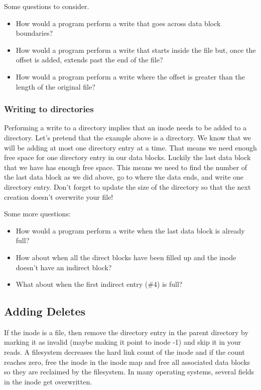 Some questions to consider.

\begin{itemize}
    \item How would a program perform a write that goes across data block boundaries?
    \item How would a program perform a write that starts inside the file but, once the offset is added, extends past the end of the file?
    \item How would a program perform a write where the offset is greater than the length of the original file?
\end{itemize}

\subsubsection{Writing to directories}
Performing a write to a directory implies that an inode needs to be added to a directory.
Let's pretend that the example above is a directory.
We know that we will be adding at most one directory entry at a time.
That means we need enough free space for one directory entry in our data blocks.
Luckily the last data block that we have has enough free space.
This means we need to find the number of the last data block as we did above, go to where the data ends, and write one directory entry.
Don't forget to update the size of the directory so that the next creation doesn't overwrite your file!

Some more questions: 

\begin{itemize}
    \item How would a program perform a write when the last data block is already full?
    \item How about when all the direct blocks have been filled up and the inode doesn't have an indirect block?
    \item What about when the first indirect entry (\#4) is full?
\end{itemize}

\subsection{Adding Deletes}

If the inode is a file, then remove the directory entry in the parent directory by marking it as invalid (maybe making it point to inode -1) and skip it in your reads.
A filesystem decreases the hard link count of the inode and if the count reaches zero, free the inode in the inode map and free all associated data blocks so they are reclaimed by the filesystem.
In many operating systems, several fields in the inode get overwritten.

